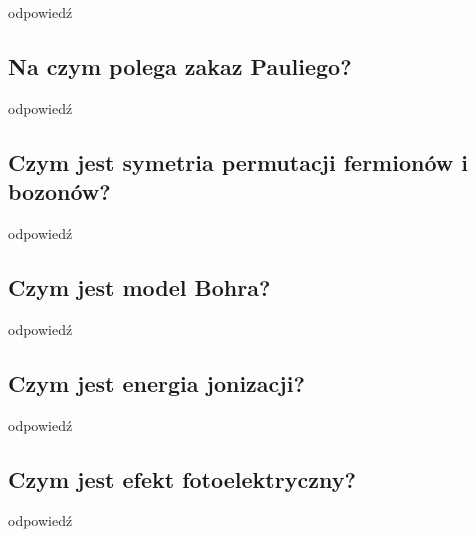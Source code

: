 odpowiedź

\subsection{Na czym polega zakaz Pauliego?}

odpowiedź

\subsection{Czym jest symetria permutacji fermionów i bozonów?}

odpowiedź

\subsection{Czym jest model Bohra?}

odpowiedź

\subsection{Czym jest energia jonizacji?}

odpowiedź

\subsection{Czym jest efekt fotoelektryczny?}

odpowiedź
